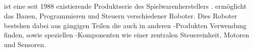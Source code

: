 \subsection{\LM}
\color{finishing}
\LM{} ist eine seit 1988 existierende Produktserie des Spielwarenherstellers \LE{} \cite[vgl.][21]{Scholz.DasEV3}. 
\LM{} ermöglicht das Bauen, Programmieren und Steuern verschiedener \LE{} Roboter. Dies Roboter bestehen dabei aus
gängigen \LE{} Teilen die auch in anderen \LE{}-Produkten Verwendung finden, sowie speziellen \LE{}-Komponenten 
wie einer zentralen Steuereinheit, Motoren und Sensoren.
